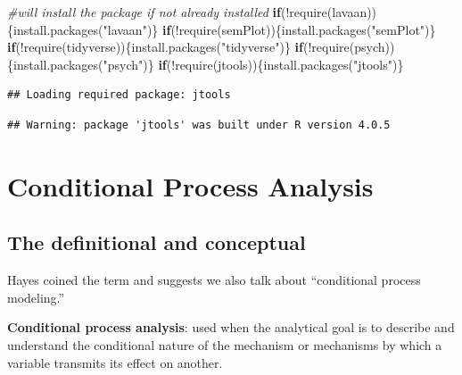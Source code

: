 \documentclass[
  english,
]{book}
\newenvironment{Shaded}{\begin{snugshade}}{\end{snugshade}}
\newcommand{\CommentTok}[1]{\textcolor[rgb]{0.56,0.35,0.01}{\textit{#1}}}
\newcommand{\ControlFlowTok}[1]{\textcolor[rgb]{0.13,0.29,0.53}{\textbf{#1}}}
\newcommand{\FunctionTok}[1]{\textcolor[rgb]{0.00,0.00,0.00}{#1}}
\newcommand{\NormalTok}[1]{#1}
\newcommand{\SpecialCharTok}[1]{\textcolor[rgb]{0.00,0.00,0.00}{#1}}
\newcommand{\StringTok}[1]{\textcolor[rgb]{0.31,0.60,0.02}{#1}}
\begin{document}
\begin{Shaded}
\begin{Highlighting}[]
\CommentTok{\#will install the package if not already installed}
\ControlFlowTok{if}\NormalTok{(}\SpecialCharTok{!}\FunctionTok{require}\NormalTok{(lavaan))\{}\FunctionTok{install.packages}\NormalTok{(}\StringTok{"lavaan"}\NormalTok{)\}}
\ControlFlowTok{if}\NormalTok{(}\SpecialCharTok{!}\FunctionTok{require}\NormalTok{(semPlot))\{}\FunctionTok{install.packages}\NormalTok{(}\StringTok{"semPlot"}\NormalTok{)\}}
\ControlFlowTok{if}\NormalTok{(}\SpecialCharTok{!}\FunctionTok{require}\NormalTok{(tidyverse))\{}\FunctionTok{install.packages}\NormalTok{(}\StringTok{"tidyverse"}\NormalTok{)\}}
\ControlFlowTok{if}\NormalTok{(}\SpecialCharTok{!}\FunctionTok{require}\NormalTok{(psych))\{}\FunctionTok{install.packages}\NormalTok{(}\StringTok{"psych"}\NormalTok{)\}}
\ControlFlowTok{if}\NormalTok{(}\SpecialCharTok{!}\FunctionTok{require}\NormalTok{(jtools))\{}\FunctionTok{install.packages}\NormalTok{(}\StringTok{"jtools"}\NormalTok{)\}}
\end{Highlighting}
\end{Shaded}

\begin{verbatim}
## Loading required package: jtools
\end{verbatim}

\begin{verbatim}
## Warning: package 'jtools' was built under R version 4.0.5
\end{verbatim}

\hypertarget{conditional-process-analysis}{%
\section{Conditional Process Analysis}\label{conditional-process-analysis}}

\hypertarget{the-definitional-and-conceptual-1}{%
\subsection{The definitional and conceptual}\label{the-definitional-and-conceptual-1}}

Hayes \citeyearpar{hayes_introduction_2018} coined the term and suggests we also talk about ``conditional process modeling.''

\textbf{Conditional process analysis}: used when the analytical goal is to describe and understand the conditional nature of the mechanism or mechanisms by which a variable transmits its effect on another.
\end{document}
